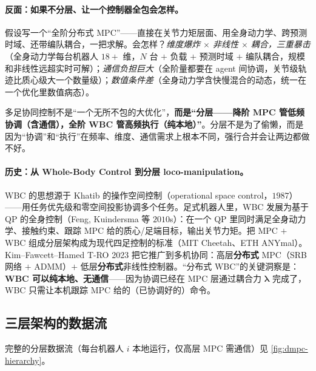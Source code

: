 \paragraph{反面：如果不分层、让一个控制器全包会怎样。}
假设写一个“全阶分布式 MPC”——直接在关节力矩层面、用全身动力学、跨预测时域、还带编队耦合，一把求解。会怎样？\emph{维度爆炸 $\times$ 非线性 $\times$ 耦合，三重暴击}（全身动力学每台机器人 $18+$ 维，$N$ 台 $+$ 负载 $+$ 预测时域 $+$ 编队耦合，规模和非线性远超实时可解）；\emph{通信负担巨大}（全阶量都要在 agent 间协调，关节级轨迹比质心级大一个数量级）；\emph{数值条件差}（全身动力学含快慢混合的动态，统一在一个优化里数值病态）。

\begin{insight}[分层 $=$ 降阶 MPC 管低频协调（含通信）$+$ 全阶 WBC 管高频执行（纯本地）]\label{ins:dmpc-layered-not}
多足协同控制不是“一个无所不包的大优化”，\textbf{而是“分层——降阶 MPC 管低频协调（含通信），全阶 WBC 管高频执行（纯本地）”}。分层不是为了偷懒，而是因为“协调”和“执行”在频率、维度、通信需求上根本不同，强行合并会让两边都做不好。
\end{insight}

\paragraph{历史：从 Whole-Body Control 到分层 loco-manipulation。}
WBC 的思想源于 Khatib 的操作空间控制（operational space control，$1987$\cite{khatib1987operational}）——用任务优先级和零空间投影协调多个任务。足式机器人里，WBC 发展为基于 QP 的全身控制（Feng, Kuindersma 等 $2010$s）：在一个 QP 里同时满足全身动力学、接触约束、跟踪 MPC 给的质心/足端目标，输出关节力矩。把 MPC $+$ WBC 组成分层架构成为现代四足控制的标准（MIT Cheetah、ETH ANYmal）。Kim--Fawcett--Hamed T-RO 2023\cite{kim2023layered} 把它推广到多机协同：高层\textbf{分布式} MPC（SRB 网络 $+$ ADMM）$+$ 低层\textbf{分布式}非线性控制器。“分布式 WBC”的关键洞察是：\textbf{WBC 可以纯本地、无通信}——因为协调已经在 MPC 层通过耦合力 $\boldsymbol{\lambda}$ 完成了，WBC 只需让本机跟踪 MPC 给的（已协调好的）命令。

\subsection{三层架构的数据流}
\label{sec:dmpc-dataflow}

完整的分层数据流（每台机器人 $i$ 本地运行，仅高层 MPC 需通信）见 \cref{fig:dmpc-hierarchy}。

